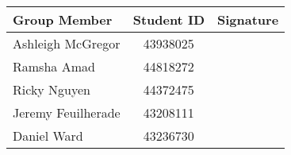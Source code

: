\begin{titlepage}
\begin{table}[h!]
\begin{center}
\begin{tabular}{ |l|c|p{4cm}| }
         \hline
         \textbf{Group Member} & \textbf{Student ID} & Signature \\
         \hline
         Ashleigh McGregor & 43938025 & \\[3ex]
         \hline
         Ramsha Amad & 44818272 & \\[3ex]
         \hline
         Ricky Nguyen & 44372475 & \\[3ex]
         \hline
         Jeremy Feuilherade & 43208111 & \\[3ex]
         \hline
         Daniel Ward & 43236730 & \\[3ex]
         \hline
         \end{tabular}
        \end{center}
    \end{table}





\end{titlepage}
